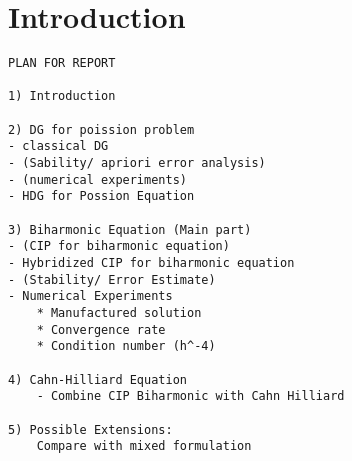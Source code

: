 \section{Introduction}\label{sec:introduction}




\begin{verbatim}
PLAN FOR REPORT

1) Introduction

2) DG for poission problem
- classical DG
- (Sability/ apriori error analysis)
- (numerical experiments)
- HDG for Possion Equation

3) Biharmonic Equation (Main part)
- (CIP for biharmonic equation)
- Hybridized CIP for biharmonic equation
- (Stability/ Error Estimate)
- Numerical Experiments
    * Manufactured solution
    * Convergence rate
    * Condition number (h^-4)

4) Cahn-Hilliard Equation
    - Combine CIP Biharmonic with Cahn Hilliard

5) Possible Extensions:
    Compare with mixed formulation
\end{verbatim}




